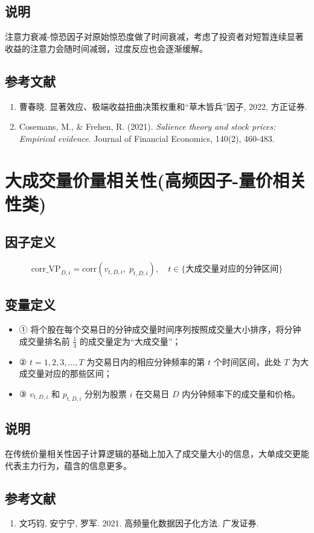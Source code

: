 \documentclass{article}
\begin{document}
\subsection{说明}
注意力衰减-惊恐因子对原始惊恐度做了时间衰减，考虑了投资者对短暂连续显著收益的注意力会随时间减弱，过度反应也会逐渐缓解。

\subsection{参考文献}
\begin{enumerate}
    \item 曹春晓. 显著效应、极端收益扭曲决策权重和“草木皆兵”因子, 2022, 方正证券.
    \item Cosemans, M., \& Frehen, R. (2021). \textit{Salience theory and stock prices: Empirical evidence}. Journal of Financial Economics, 140(2), 460-483.
\end{enumerate}

\section{大成交量价量相关性(高频因子-量价相关性类)}

\subsection{因子定义}
\begin{equation}
    \mathrm{corr\_VP}_{D,i} = \mathrm{corr} \left( v_{t,D,i}, \; p_{t,D,i} \right), \quad t \in \{ \text{大成交量对应的分钟区间} \}
\end{equation}

\subsection{变量定义}
\begin{itemize}
    \item ① 将个股在每个交易日的分钟成交量时间序列按照成交量大小排序，将分钟成交量排名前 \( \frac{1}{3} \) 的成交量定为“大成交量”；
    \item ② \( t=1,2,3,\ldots,T \) 为交易日内的相应分钟频率的第 \( t \) 个时间区间，此处 \( T \) 为大成交量对应的那些区间；
    \item ③ \( v_{t,D,i} \) 和 \( p_{t,D,i} \) 分别为股票 \( i \) 在交易日 \( D \) 内分钟频率下的成交量和价格。
\end{itemize}

\subsection{说明}
在传统价量相关性因子计算逻辑的基础上加入了成交量大小的信息，大单成交更能代表主力行为，蕴含的信息更多。

\subsection{参考文献}
\begin{enumerate}
    \item 文巧钧, 安宁宁, 罗军. 2021. 高频量化数据因子化方法. 广发证券.
\end{enumerate}
\end{document}
